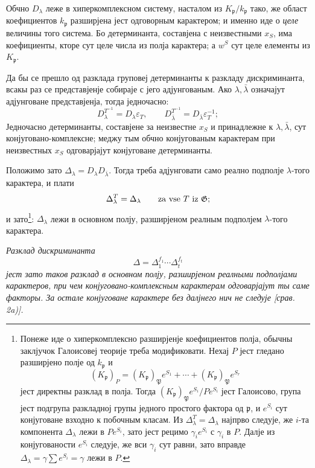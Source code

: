 \documentclass[11pt]{article}
\providecommand{\frakp}{\mathfrak{p}}
\providecommand{\Gg}{\mathfrak{G}}
\begin{document}
Обчно \(D_\lambda\) леже в хиперкомплексном систему, насталом из \(K_\frakp/k_\frakp\) тако, же област коефициентов \(k_\frakp\) разширјена јест одговорным карактером; и именно иде о \emph{целе} величины того система. Бо детерминанта, составјена с неизвестными \(x_S\), има коефициенты, кторе сут целе числа из полја карактера; а \(w^S\) сут целе елементы из \(K_\frakp\).

Да бы се прешло од разклада груповеј детерминанты к разкладу дискриминанта, всакы раз се представјенје собираје с јего адјунгованым. Ако \(\lambda,\bar\lambda\) означајут адјунговане представјенја, тогда једночасно:
\[
        D_\lambda^{T^{-1}}=D_\lambda\varepsilon_T,
        \qquad
        D_{\bar\lambda}^{T^{-1}}=D_{\bar\lambda}\varepsilon_T^{-1};
\]
Једночасно детерминанты, составјене за неизвестне \(x_S\) и принадлежне к \(\lambda,\bar\lambda\), сут конјуговано-комплексне; меджу тым обчно конјугованым карактерам при неизвестных \(x_S\) одговарјајут конјуговане детерминанты.

Положимо зато \(\Delta_\lambda=D_\lambda D_{\bar\lambda}\). Тогда треба адјунговати само реално подполје \(\lambda\)-того карактера, и плати
\[
        \Delta_\lambda^T=\Delta_\lambda
        \qquad\hbox{za vse }T\hbox{ iz }\Gg;
\]
и зато\footnote{Понеже иде о хиперкомплексно разширјенје коефициентов полја, обычны заклјучок Галоисовеј теорије треба модификовати. Нехај \(P\) јест гледано разширјено полје од \(k_\frakp\) и
\[
        (K_\frakp)_P=(K_\frakp)_\mathfrak P e^{S_1}+\cdots+(K_\frakp)_\mathfrak P e^{S_r}
\]
јест директны разклад в полја. Тогда \((K_\frakp)_\mathfrak P e^{S_i}/Pe^{S_i}\) јест Галоисово, група јест подгрупа разкладној групы једного простого фактора од \(\frakp\), и \(e^{S_i}\) сут конјуговане взходно к побочным класам. Из \(\Delta_\lambda^T=\Delta_\lambda\) најпрво следује, же \(i\)-та компонента \(\Delta_\lambda\) лежи в \(Pe^{S_i}\), зато јест рецимо \(\gamma_i e^{S_i}\) с \(\gamma_i\) в \(P\). Далје из конјугованости \(e^{S_i}\) следује, же вси \(\gamma_i\) сут равни, зато вправде \(\Delta_\lambda=\gamma\sum e^{S_i}=\gamma\) лежи в \(P\).}: \(\Delta_\lambda\) лежи в основном полју, разширјеном реалным подполјем \(\lambda\)-того карактера.

\emph{Разклад дискриминанта}
\[
        \Delta=\Delta_1^{f_1}\cdots\Delta_t^{f_t}
\]
\emph{јест зато таков разклад в основном полју, разширјеном реалными подполјами карактеров, при чем конјуговано-комплексным карактерам одговарјајут ты саме факторы. За остале конјуговане карактере без далјнего нич не следује [срав. 2a)].}
\end{document}
